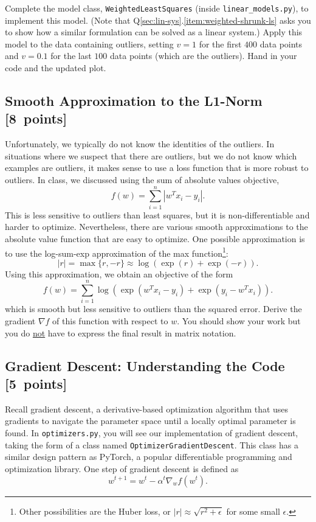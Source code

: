 \documentclass{article}
\newcommand{\blu}[1]{{\textcolor{blu}{#1}}}
\let\ask\blu
\newcommand\pts[1]{\textcolor{pointscolour}{[#1~points]}}
\begin{document}
Complete the model class, \texttt{WeightedLeastSquares} (inside \texttt{linear\_models.py}), to implement this model.
(Note that Q\ref{sec:lin-sys}.\ref{item:weighted-shrunk-ls} asks you to show how a similar formulation can be solved as a linear system.)
Apply this model to the data containing outliers, setting $v = 1$ for the first
$400$ data points and $v = 0.1$ for the last $100$ data points (which are the outliers).
\ask{Hand in your code and the updated plot}.



\subsection{Smooth Approximation to the L1-Norm \pts{8}}

Unfortunately, we typically do not know the identities of the outliers. In situations where we suspect that there are outliers, but we do not know which examples are outliers, it makes sense to use a loss function that is more robust to outliers. In class, we discussed using the sum of absolute values objective,
\[
f(w) = \sum_{i=1}^n |w^Tx_i - y_i|.
\]
This is less sensitive to outliers than least squares, but it is non-differentiable and harder to optimize. Nevertheless, there are various smooth approximations to the absolute value function that are easy to optimize. One possible approximation is to use the log-sum-exp approximation of the max function\footnote{Other possibilities are the Huber loss, or $|r|\approx \sqrt{r^2+\epsilon}$ for some small $\epsilon$.}:
\[
|r| = \max\{r, -r\} \approx \log(\exp(r) + \exp(-r)).
\]
Using this approximation, we obtain an objective of the form
\[
f(w) {=} \sum_{i=1}^n  \log\left(\exp(w^Tx_i - y_i) + \exp(y_i - w^Tx_i)\right).
\]
which is smooth but less sensitive to outliers than the squared error. \ask{Derive
 the gradient $\nabla f$ of this function with respect to $w$. You should show your work but you do \underline{not} have to express the final result in matrix notation.}

%

\subsection{Gradient Descent: Understanding the Code \pts{5}}

Recall gradient descent, a derivative-based optimization algorithm that uses gradients to navigate the parameter space until a locally optimal parameter is found. In \texttt{optimizers.py}, you will see our implementation of gradient descent, taking the form of a class named \texttt{OptimizerGradientDescent}. This class has a similar design pattern as PyTorch, a popular differentiable programming and optimization library. One step of gradient descent is defined as
\[
	w^{t+1} = w^t - \alpha^t \nabla_w f(w^t)
.\]
\end{document}
